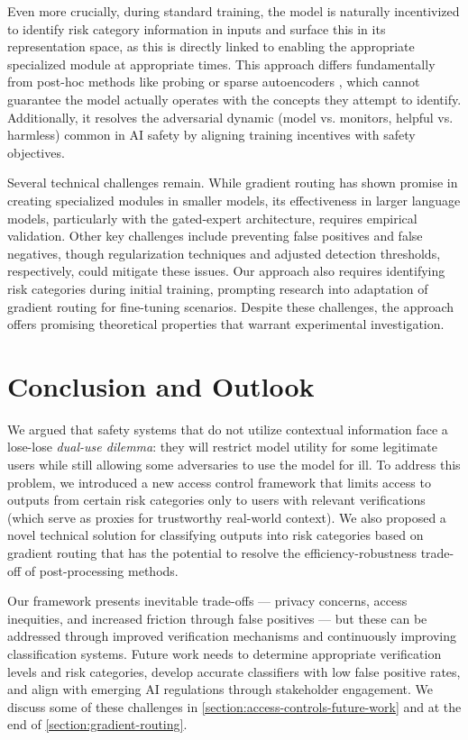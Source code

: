 \documentclass{article}
\theoremstyle{plain}
\theoremstyle{definition}
\theoremstyle{remark}
\begin{document}
Even more crucially, during standard training, the model is naturally incentivized to identify risk category information in inputs and surface this in its representation space, as this is directly linked to enabling the appropriate specialized module at appropriate times.
This approach differs fundamentally from post-hoc methods like probing or sparse autoencoders \cite{cunningham2023sparseautoencodershighlyinterpretable}, which cannot guarantee the model actually operates with the concepts they attempt to identify.
Additionally, it resolves the adversarial dynamic (model vs. monitors, helpful vs. harmless) common in AI safety by aligning training incentives with safety objectives.

Several technical challenges remain. While gradient routing has shown promise in creating specialized modules in smaller models, its effectiveness in larger language models, particularly with the gated-expert architecture, requires empirical validation. Other key challenges include preventing false positives and false negatives, though regularization techniques and adjusted detection thresholds, respectively, could mitigate these issues. Our approach also requires identifying risk categories during initial training, prompting research into adaptation of gradient routing for fine-tuning scenarios. Despite these challenges, the approach offers promising theoretical properties that warrant experimental investigation.

\section{Conclusion and Outlook}

We argued that safety systems that do not utilize contextual information face a lose-lose \emph{dual-use dilemma}: they will restrict model utility for some legitimate users while still allowing some adversaries to use the model for ill. To address this problem, we introduced a new access control framework that limits access to outputs from certain risk categories only to users with relevant verifications (which serve as proxies for trustworthy real-world context). We also proposed a novel technical solution for classifying outputs into risk categories based on gradient routing that has the potential to resolve the efficiency-robustness trade-off of post-processing methods.

Our framework presents inevitable trade-offs --- privacy concerns, access inequities, and increased friction through false positives --- but these can be addressed through improved verification mechanisms and continuously improving classification systems. Future work needs to determine appropriate verification levels and risk categories, develop accurate classifiers with low false positive rates, and align with emerging AI regulations through stakeholder engagement. We discuss some of these challenges in \cref{section:access-controls-future-work} and at the end of \cref{section:gradient-routing}.
\end{document}
